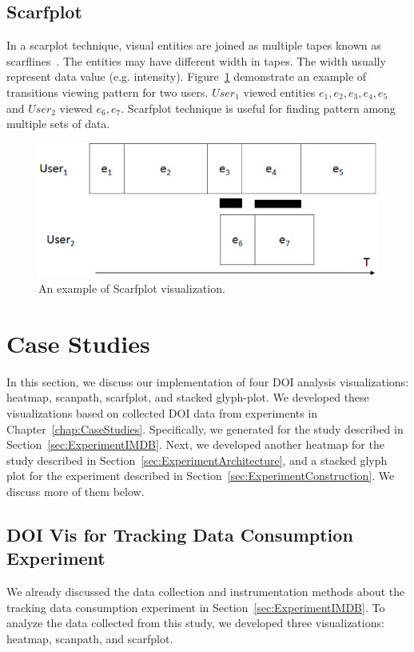 \subsection{Scarfplot}
In a scarplot technique, visual entities are joined as multiple tapes known as scarflines~\cite{richardson2005looking}. The entities may have different width in tapes. The width usually represent data value (e.g. intensity). Figure~\ref{fig:scarfplotExample} demonstrate an example of transitions viewing pattern for two users. $User_1$ viewed entities $e_1, e_2, e_3, e_4,e_5$ and $User_2$ viewed $e_6, e_7$. Scarfplot technique is useful for finding pattern among multiple sets of data. 
\begin{figure}[htbp]
  \centering
  \includegraphics[width=\linewidth]{images/ScarfplotExample.eps}
  \caption{An example of Scarfplot visualization. }
	\label{fig:scarfplotExample}
\end{figure}

\section{Case Studies}
In this section, we discuss our implementation of four DOI analysis visualizations: heatmap, scanpath, scarfplot, and stacked glyph-plot. We developed these visualizations based on collected DOI data from experiments in Chapter~\ref{chap:CaseStudies}. Specifically, we generated for the study described in Section~\ref{sec:ExperimentIMDB}. Next, we developed another heatmap for the study described in Section~\ref{sec:ExperimentArchitecture}, and a stacked glyph plot for the experiment described in Section~\ref{sec:ExperimentConstruction}. We discuss more of them below. 

\subsection{DOI Vis for Tracking Data Consumption Experiment}
We already discussed the data collection and instrumentation methods about the tracking data consumption experiment in Section~\ref{sec:ExperimentIMDB}. To analyze the data collected from this study, we developed three visualizations: heatmap, scanpath, and scarfplot. 

